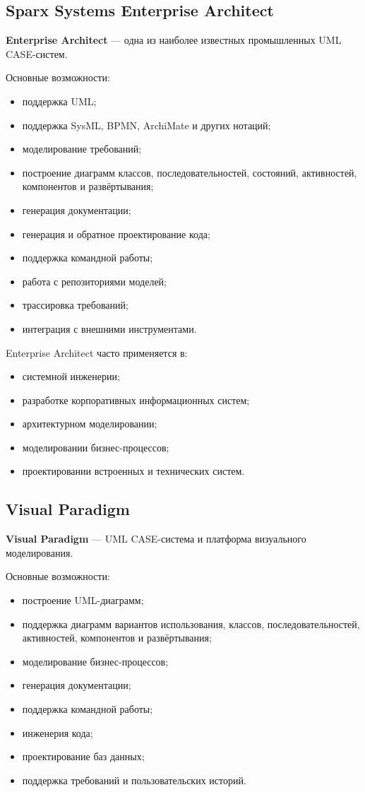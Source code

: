 \documentclass[12pt,a4paper]{article}
\begin{document}
\subsection{Sparx Systems Enterprise Architect}

\textbf{Enterprise Architect} --- одна из наиболее известных промышленных UML CASE-систем.

Основные возможности:
\begin{itemize}
    \item поддержка UML;
    \item поддержка SysML, BPMN, ArchiMate и других нотаций;
    \item моделирование требований;
    \item построение диаграмм классов, последовательностей, состояний, активностей, компонентов и развёртывания;
    \item генерация документации;
    \item генерация и обратное проектирование кода;
    \item поддержка командной работы;
    \item работа с репозиториями моделей;
    \item трассировка требований;
    \item интеграция с внешними инструментами.
\end{itemize}

Enterprise Architect часто применяется в:
\begin{itemize}
    \item системной инженерии;
    \item разработке корпоративных информационных систем;
    \item архитектурном моделировании;
    \item моделировании бизнес-процессов;
    \item проектировании встроенных и технических систем.
\end{itemize}

\subsection{Visual Paradigm}

\textbf{Visual Paradigm} --- UML CASE-система и платформа визуального моделирования.

Основные возможности:
\begin{itemize}
    \item построение UML-диаграмм;
    \item поддержка диаграмм вариантов использования, классов, последовательностей, активностей, компонентов и развёртывания;
    \item моделирование бизнес-процессов;
    \item генерация документации;
    \item поддержка командной работы;
    \item инженерия кода;
    \item проектирование баз данных;
    \item поддержка требований и пользовательских историй.
\end{itemize}
\end{document}
